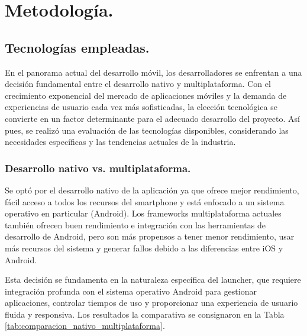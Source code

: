 \section{Metodología.}

\subsection{Tecnologías empleadas.}

En el panorama actual del desarrollo móvil, los desarrolladores se enfrentan a una decisión fundamental entre el desarrollo nativo y multiplataforma. Con el crecimiento exponencial del mercado de aplicaciones móviles y la demanda de experiencias de usuario cada vez más sofisticadas, la elección tecnológica se convierte en un factor determinante para el adecuado desarrollo del proyecto. Así pues, se realizó una evaluación de las tecnologías disponibles, considerando las necesidades específicas y las tendencias actuales de la industria.


\subsubsection{Desarrollo nativo vs. multiplataforma.}

Se optó por el desarrollo nativo de la aplicación ya que ofrece mejor rendimiento, fácil acceso a todos los recursos del smartphone y está enfocado a un sistema operativo en particular (Android). Los frameworks multiplataforma actuales también ofrecen buen rendimiento e integración con las herramientas de desarrollo de Android, pero son más propensos a tener menor rendimiento, usar más recursos del sistema y generar fallos debido a las diferencias entre iOS y Android.

Esta decisión se fundamenta en la naturaleza específica del launcher, que requiere integración profunda con el sistema operativo Android para gestionar aplicaciones, controlar tiempos de uso y proporcionar una experiencia de usuario fluida y responsiva. Los resultados la comparativa se consignaron en la Tabla \ref{tab:comparacion_nativo_multiplataforma}.

